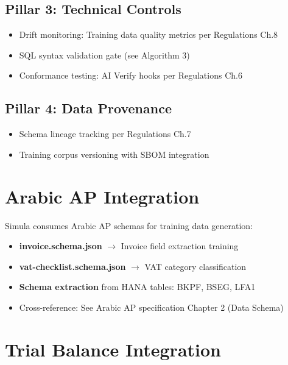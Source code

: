 \subsection{Pillar 3: Technical Controls}

\begin{itemize}
  \item Drift monitoring: Training data quality metrics per Regulations Ch.8
  \item SQL syntax validation gate (see Algorithm 3)
  \item Conformance testing: AI Verify hooks per Regulations Ch.6
\end{itemize}

\subsection{Pillar 4: Data Provenance}

\begin{itemize}
  \item Schema lineage tracking per Regulations Ch.7
  \item Training corpus versioning with SBOM integration
\end{itemize}

\section{Arabic AP Integration}
\label{sec:arabic-integration}

Simula consumes Arabic AP schemas for training data generation:

\begin{itemize}
  \item \textbf{invoice.schema.json} $\rightarrow$ Invoice field extraction training
  \item \textbf{vat-checklist.schema.json} $\rightarrow$ VAT category classification
  \item \textbf{Schema extraction} from HANA tables: BKPF, BSEG, LFA1
  \item Cross-reference: See Arabic AP specification Chapter 2 (Data Schema)
\end{itemize}

\section{Trial Balance Integration}
\label{sec:tb-integration}

